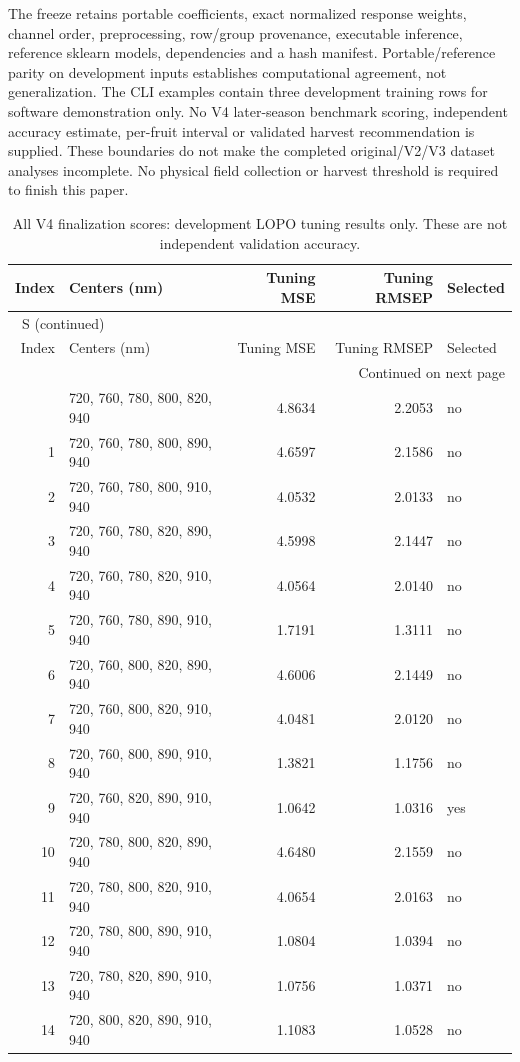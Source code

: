 \documentclass[10pt,a4paper]{article}
\renewcommand{\thetable}{S\arabic{table}}
\begin{document}
The freeze retains portable coefficients, exact normalized response weights, channel order, preprocessing, row/group provenance, executable inference, reference sklearn models, dependencies and a hash manifest. Portable/reference parity on development inputs establishes computational agreement, not generalization. The CLI examples contain three development training rows for software demonstration only. No V4 later-season benchmark scoring, independent accuracy estimate, per-fruit interval or validated harvest recommendation is supplied. These boundaries do not make the completed original/V2/V3 dataset analyses incomplete. No physical field collection or harvest threshold is required to finish this paper.

\clearpage
\begingroup\small
\setlength{\tabcolsep}{3.5pt}
\renewcommand{\arraystretch}{1.10}
\begin{longtable}{rlrrl}
\caption{All V4 finalization scores: development LOPO tuning results only. These are not independent validation accuracy.}\label{tab:candidateselection}\\
\toprule
Index & Centers (nm) & Tuning MSE & Tuning RMSEP & Selected \\
\midrule
\endfirsthead
\multicolumn{5}{l}{\tablename~\thetable{} (continued)}\\
\toprule
Index & Centers (nm) & Tuning MSE & Tuning RMSEP & Selected \\
\midrule
\endhead
\midrule
\multicolumn{5}{r}{Continued on next page}\\
\endfoot
\bottomrule
\endlastfoot
0 & 720, 760, 780, 800, 820, 940 & 4.8634 & 2.2053 & no \\
1 & 720, 760, 780, 800, 890, 940 & 4.6597 & 2.1586 & no \\
2 & 720, 760, 780, 800, 910, 940 & 4.0532 & 2.0133 & no \\
3 & 720, 760, 780, 820, 890, 940 & 4.5998 & 2.1447 & no \\
4 & 720, 760, 780, 820, 910, 940 & 4.0564 & 2.0140 & no \\
5 & 720, 760, 780, 890, 910, 940 & 1.7191 & 1.3111 & no \\
6 & 720, 760, 800, 820, 890, 940 & 4.6006 & 2.1449 & no \\
7 & 720, 760, 800, 820, 910, 940 & 4.0481 & 2.0120 & no \\
8 & 720, 760, 800, 890, 910, 940 & 1.3821 & 1.1756 & no \\
9 & 720, 760, 820, 890, 910, 940 & 1.0642 & 1.0316 & yes \\
10 & 720, 780, 800, 820, 890, 940 & 4.6480 & 2.1559 & no \\
11 & 720, 780, 800, 820, 910, 940 & 4.0654 & 2.0163 & no \\
12 & 720, 780, 800, 890, 910, 940 & 1.0804 & 1.0394 & no \\
13 & 720, 780, 820, 890, 910, 940 & 1.0756 & 1.0371 & no \\
14 & 720, 800, 820, 890, 910, 940 & 1.1083 & 1.0528 & no \\
\end{longtable}
\endgroup
\end{document}

